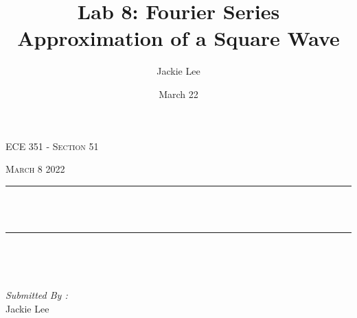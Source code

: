 \documentclass[12pt]{report}
\title{Lab 8: Fourier Series Approximation of a Square Wave}
\author{ Jackie Lee}
\date{March 22}
\makeatletter
\let\thetitle\@title
\makeatother
\begin{document}

\begin{titlepage}
	\centering
    \vspace*{0.5 cm}
\begin{center}    \textsc{\Large   ECE 351 - Section 51 }\\[2.0 cm]	\end{center}%
	\textsc{\Large March 8 2022  }\\[0.5 cm]				%
	\rule{\linewidth}{0.2 mm} \\[0.4 cm]
	{ \huge \bfseries \thetitle}\\
	\rule{\linewidth}{0.2 mm} \\[1.5 cm]
	
	\begin{minipage}{0.4\textwidth}
		\begin{flushleft} \large
			\end{flushleft}
			\end{minipage}~
			\begin{minipage}{0.4\textwidth}
            
			\begin{flushright} \large
			\emph{Submitted By :} \\
			Jackie Lee  
		\end{flushright}
           
	\end{minipage}\\[2 cm]
	
    
    
    
    
	
\end{titlepage}


\tableofcontents
\pagebreak

\renewcommand{\thesection}{\arabic{section}}
\end{document}

